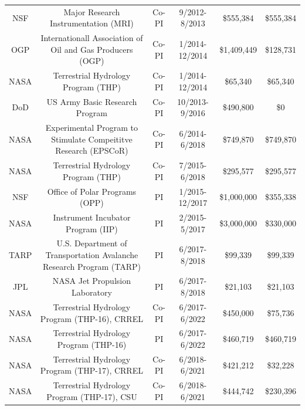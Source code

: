\documentclass[11pt]{article}
\begin{document}
\begin{table}[!htbp]
\begin{tabular}{cccccc}
NSF              & Major Research Instrumentation (MRI)                                    & Co-PI & 9/2012-8/2013    & \$555,384    & \$555,384  \\
OGP              & Internationall Association of Oil and Gas Producers (OGP)               & Co-PI & 1/2014-12/2014   & \$1,409,449  & \$128,731 \\
NASA             & Terrestrial Hydrology Program (THP)                                     & Co-PI & 1/2014-12/2014   & \$65,340     & \$65,340 \\
DoD              & US Army Basic Research Program                                          & Co-PI & 10/2013-9/2016   & \$490,800    & \$0  \\
NASA             & Experimental Program to Stimulate Compeititve Research (EPSCoR)         & Co-PI & 6/2014-6/2018    & \$749,870    & \$749,870   \\
NASA             & Terrestrial Hydrology Program (THP)                                     & Co-PI & 7/2015-6/2018    & \$295,577    & \$295,577  \\
NSF              & Office of Polar Programs (OPP)                                          & PI    & 1/2015-12/2017   & \$1,000,000  & \$355,338  \\
NASA             & Instrument Incubator Program (IIP)                                      & PI    & 2/2015-5/2017    & \$3,000,000  & \$330,000  \\
TARP             & U.S. Department of Transportation Avalanche Research Program (TARP)     & PI    & 6/2017-8/2018    & \$99,339     & \$99,339 \\
JPL              & NASA Jet Propulsion Laboratory                                          & PI    & 6/2017-8/2018    & \$21,103     & \$21,103  \\
NASA             & Terrestrial Hydrology Program (THP-16), CRREL                      & Co-PI & 6/2017-6/2022    & \$450,000    & \$75,736 \\
NASA             & Terrestrial Hydrology Program (THP-16)                                  & PI    & 6/2017-6/2022    & \$460,719    & \$460,719 \\
NASA             & Terrestrial Hydrology Program (THP-17), CRREL                    & Co-PI & 6/2018-6/2021    & \$421,212    & \$32,228  \\
NASA             & Terrestrial Hydrology Program (THP-17), CSU                         & Co-PI & 6/2018-6/2021    & \$444,742    & \$230,396  \\

\end{tabular}
\end{table}
\end{document}
